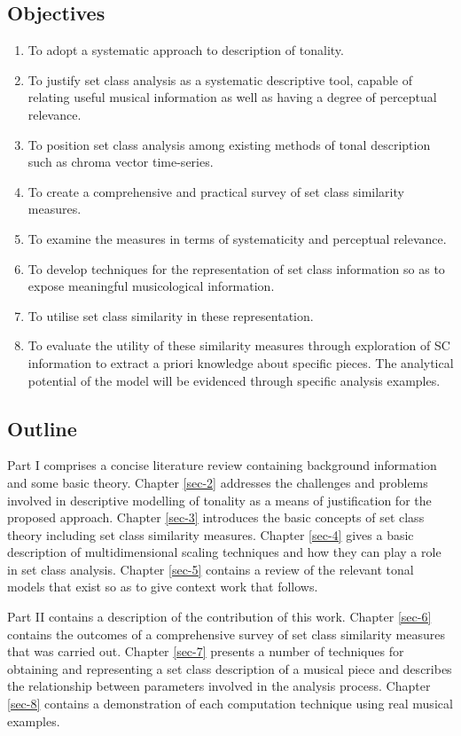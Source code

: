 \documentclass{article}
\begin{document}
\subsection{Objectives}
\label{sec-1-2}

\begin{enumerate}
\item To adopt a systematic approach to description of tonality.
\item To justify set class analysis as a systematic descriptive tool,
   capable of relating useful musical information as well as having a
   degree of perceptual relevance.
\item To position set class analysis among existing methods of tonal
   description such as chroma vector time-series.
\item To create a comprehensive and practical survey of set class
   similarity measures.
\item To examine the measures in terms of systematicity and perceptual
   relevance.
\item To develop techniques for the representation of set class
   information so as to expose meaningful musicological information.
\item To utilise set class similarity in these representation.
\item To evaluate the utility of these similarity measures through
   exploration of SC information to extract a priori knowledge about
   specific pieces. The analytical potential of the model will be
   evidenced through specific analysis examples.
\end{enumerate}
\subsection{Outline}
\label{sec-1-3}

Part I comprises a concise literature review containing background
information and some basic theory. Chapter \ref{sec-2} addresses the
challenges and problems involved in descriptive modelling of tonality
as a means of justification for the proposed approach. Chapter \ref{sec-3} introduces the basic concepts of set class theory
including set class similarity measures. Chapter \ref{sec-4} gives a basic description of multidimensional scaling
techniques and how they can play a role in set class analysis. Chapter
\ref{sec-5} contains a review of the relevant tonal
models that exist so as to give context work that follows.

Part II contains a description of the contribution of this
work. Chapter \ref{sec-6} contains the outcomes of a
comprehensive survey of set class similarity measures that was carried
out. Chapter \ref{sec-7} presents a number of techniques for
obtaining and representing a set class description of a musical piece
and describes the relationship between parameters involved in the
analysis process. Chapter \ref{sec-8} contains a demonstration
of each computation technique using real musical examples.
\end{document}
